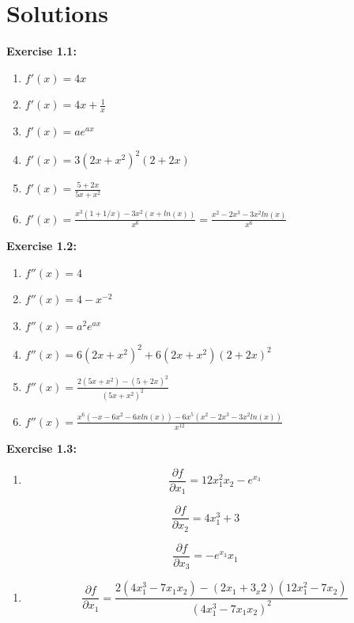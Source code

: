 \documentclass[
]{book}
\providecommand{\tightlist}{%
  \setlength{\itemsep}{0pt}\setlength{\parskip}{0pt}}
\theoremstyle{definition}
\theoremstyle{definition}
\theoremstyle{definition}
\theoremstyle{definition}
\theoremstyle{remark}
\begin{document}
\hypertarget{solutions}{%
\section*{Solutions}\label{solutions}}

\textbf{Exercise 1.1:}

\begin{enumerate}
\def\labelenumi{\alph{enumi}.}
\item
  \(f'(x)=4x\)
\item
  \(f'(x)=4x+\frac{1}{x}\)
\item
  \(f'(x)=ae^{ax}\)
\item
  \(f'(x)=3(2x+x^2)^2(2+2x)\)
\item
  \(f'(x)=\displaystyle \frac{5+2x}{5x+x^2}\)
\item
  \(f'(x)=\displaystyle \frac{x^3(1+1/x)-3x^2(x+ln(x))}{x^6}= \frac{x^2-2x^3-3x^2 ln(x)}{x^6}\)
\end{enumerate}

\textbf{Exercise 1.2:}

\begin{enumerate}
\def\labelenumi{\alph{enumi}.}
\item
  \(f''(x)=4\)
\item
  \(f''(x)=4-x^{-2}\)
\item
  \(f''(x)=a^2e^{ax}\)
\item
  \(f''(x)= 6(2x+x^2)^2+ 6(2x+x^2)(2+2x)^2\)
\item
  \(f''(x)=\displaystyle \frac{2(5x+x^2)-(5+2x)^2}{(5x+x^2)^2}\)
\item
  \(f''(x)=\displaystyle \frac{x^6(-x-6x^2-6xln(x))-6x^5(x^2-2x^3-3x^2 ln(x))}{x^{12}}\)
\end{enumerate}

\textbf{Exercise 1.3:}

\begin{enumerate}
\def\labelenumi{\alph{enumi}.}
\tightlist
\item
  \[\frac{\partial f}{\partial x_1}=12x_1^2x_2-e^{x_3} \]
\end{enumerate}

\[\frac{\partial f}{\partial x_2}=4x_1^3+3 \]

\[\frac{\partial f}{\partial x_3}=-e^{x_3}x_1 \]

\begin{enumerate}
\def\labelenumi{\alph{enumi}.}
\setcounter{enumi}{1}
\tightlist
\item
  \[\frac{\partial f}{\partial x_1}=\frac{2(4x_1^3-7x_1x_2)-(2x_1+3_x2)(12x_1^2-7x_2)}{(4x_1^3-7x_1x_2)^2}\]
\end{enumerate}
\end{document}

